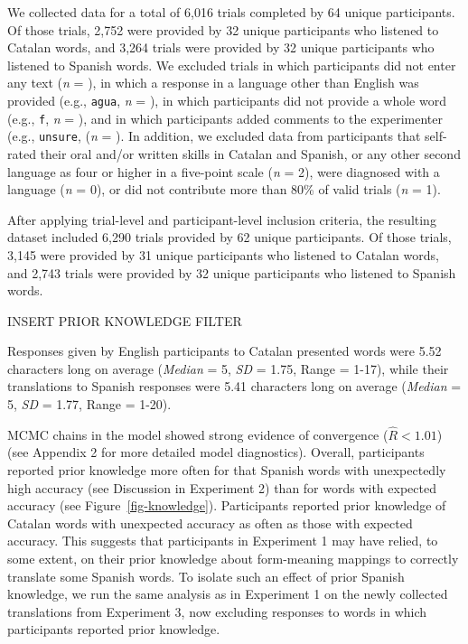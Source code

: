 \documentclass[
]{article}
\begin{document}
We collected data for a total of 6,016 trials completed by 64 unique
participants. Of those trials, 2,752 were provided by 32 unique
participants who listened to Catalan words, and 3,264 trials were
provided by 32 unique participants who listened to Spanish words. We
excluded trials in which participants did not enter any text (\emph{n} =
), in which a response in a language other than English was provided
(e.g., \texttt{agua}, \emph{n} = ), in which participants did not
provide a whole word (e.g., \texttt{f}, \emph{n} = ), and in which
participants added comments to the experimenter (e.g., \texttt{unsure},
(\emph{n} = ). In addition, we excluded data from participants that
self-rated their oral and/or written skills in Catalan and Spanish, or
any other second language as four or higher in a five-point scale
(\emph{n} = 2), were diagnosed with a language (\emph{n} = 0), or did
not contribute more than 80\% of valid trials (\emph{n} = 1).

After applying trial-level and participant-level inclusion criteria, the
resulting dataset included 6,290 trials provided by 62 unique
participants. Of those trials, 3,145 were provided by 31 unique
participants who listened to Catalan words, and 2,743 trials were
provided by 32 unique participants who listened to Spanish words.

INSERT PRIOR KNOWLEDGE FILTER

Responses given by English participants to Catalan presented words were
5.52 characters long on average (\emph{Median} = 5, \emph{SD} = 1.75,
Range = 1-17), while their translations to Spanish responses were 5.41
characters long on average (\emph{Median} = 5, \emph{SD} = 1.77, Range =
1-20).

MCMC chains in the model showed strong evidence of convergence
(\(\hat{R}<1.01\)) (see Appendix 2 for more detailed model diagnostics).
Overall, participants reported prior knowledge more often for that
Spanish words with unexpectedly high accuracy (see Discussion in
Experiment 2) than for words with expected accuracy (see
Figure~\ref{fig-knowledge}). Participants reported prior knowledge of
Catalan words with unexpected accuracy as often as those with expected
accuracy. This suggests that participants in Experiment 1 may have
relied, to some extent, on their prior knowledge about form-meaning
mappings to correctly translate some Spanish words. To isolate such an
effect of prior Spanish knowledge, we run the same analysis as in
Experiment 1 on the newly collected translations from Experiment 3, now
excluding responses to words in which participants reported prior
knowledge.
\end{document}
